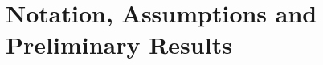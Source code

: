 \documentclass[reqno,11pt]{amsart}
\numberwithin{equation}{section}
\newcommand{\be}{\begin{equation}}
\newcommand{\ee}{\end{equation}}
\newcommand{\R}{\mathbb{R}} %
\newcommand{\e}{\varepsilon}
\newcommand{\T}{\mathbb{T}}
\newcommand{\nd}{\noindent}
\renewcommand{\bar}{\overline}
\begin{document}

\section{Notation, Assumptions and Preliminary Results}\label{assumptionssec}
\end{document}
